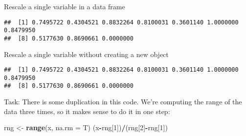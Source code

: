 \documentclass[
]{article}
\newenvironment{Shaded}{\begin{snugshade}}{\end{snugshade}}
\newcommand{\AttributeTok}[1]{\textcolor[rgb]{0.13,0.29,0.53}{#1}}
\newcommand{\ConstantTok}[1]{\textcolor[rgb]{0.56,0.35,0.01}{#1}}
\newcommand{\DecValTok}[1]{\textcolor[rgb]{0.00,0.00,0.81}{#1}}
\newcommand{\FunctionTok}[1]{\textcolor[rgb]{0.13,0.29,0.53}{\textbf{#1}}}
\newcommand{\NormalTok}[1]{#1}
\newcommand{\OtherTok}[1]{\textcolor[rgb]{0.56,0.35,0.01}{#1}}
\newcommand{\SpecialCharTok}[1]{\textcolor[rgb]{0.81,0.36,0.00}{\textbf{#1}}}
\begin{document}
Rescale a single variable in a data frame

\begin{Shaded}
\end{Shaded}

\begin{verbatim}
##  [1] 0.7495722 0.4304521 0.8832264 0.8100031 0.3601140 1.0000000 0.8479950
##  [8] 0.5177630 0.8690661 0.0000000
\end{verbatim}

Rescale a single variable without creating a new object

\begin{Shaded}
\end{Shaded}

\begin{verbatim}
##  [1] 0.7495722 0.4304521 0.8832264 0.8100031 0.3601140 1.0000000 0.8479950
##  [8] 0.5177630 0.8690661 0.0000000
\end{verbatim}

Task: There is some duplication in this code. We're computing the range
of the data three times, so it makes sense to do it in one step:

\begin{Shaded}
\begin{Highlighting}[]
\NormalTok{rng }\OtherTok{\textless{}{-}} \FunctionTok{range}\NormalTok{(x, }\AttributeTok{na.rm =}\NormalTok{ T)}
\NormalTok{(x}\SpecialCharTok{{-}}\NormalTok{rng[}\DecValTok{1}\NormalTok{])}\SpecialCharTok{/}\NormalTok{(rng[}\DecValTok{2}\NormalTok{]}\SpecialCharTok{{-}}\NormalTok{rng[}\DecValTok{1}\NormalTok{])}
\end{Highlighting}
\end{Shaded}
\end{document}
